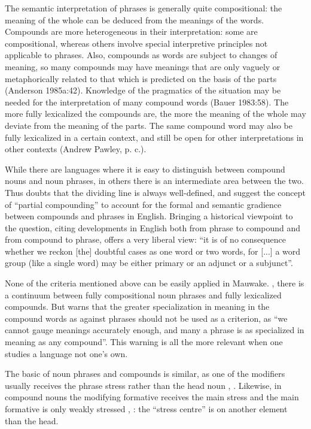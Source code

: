 The semantic interpretation of phrases is generally quite compositional: the meaning of the whole can be deduced from the meanings of the words. Compounds are more heterogeneous in their interpretation: some are compositional, whereas others involve special interpretive principles not applicable to phrases. Also, compounds as words are subject to changes of meaning, so many compounds may have meanings that are only vaguely or metaphorically related to that which is predicted on the basis of the parts (Anderson{ 1985a}:42). Knowledge of the pragmatics of the situation may be needed for the interpretation of many compound words (Bauer{ 1983}:58). The more fully lexicalized the compounds are, the more the meaning of the whole may deviate from the meaning of the parts. The same compound word may also be fully lexicalized in a certain context, and still be open for other interpretations in other contexts (Andrew Pawley, p. c.). 

While there are languages where it is easy to distinguish between compound nouns and noun phrases, in others there is an intermediate area between the two. Thus \citet[810]{Downing1977} doubts that the dividing line is always well-defined, and  \citet[1569]{QuirkEtAl1989} suggest the concept of ``partial compounding'' to account for the formal and semantic gradience between compounds and phrases in English. Bringing a historical viewpoint to the question, citing developments in English both from phrase to compound and from compound to phrase, \citet[102]{Jespersen1924} offers a very liberal view: ``it is of no consequence whether we reckon [the] doubtful cases as one word or two words, for [...] a word group (like a single word) may be either primary or an adjunct or a subjunct''. 

None of the criteria mentioned above can be easily applied in Mauwake. , there is a continuum between fully compositional noun phrases and fully lexicalized compounds. But \citet[227]{Bloomfield1933} warns that the greater specialization in meaning in the compound words as against phrases should not be used as a criterion, as ``we cannot gauge meanings accurately enough, and many a phrase is as specialized in meaning as any compound''. This warning is all the more relevant when one studies a language not one's own. 

The basic  of noun phrases and compounds is similar, as one of the modifiers usually receives the phrase stress rather than the head noun , . Likewise, in compound nouns the modifying formative receives the main stress and the main formative is only weakly stressed , : the ``stress centre'' \citep[45]{Anderson1985a} is on another element than the head. 

